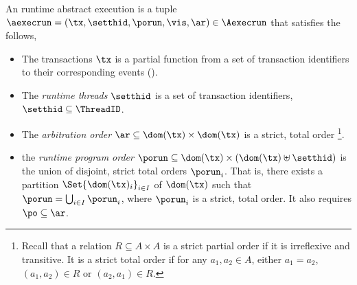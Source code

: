 \begin{defn}
\label{def:run-abs-exec}
\label{def:abs-exec}
An runtime abstract execution is a tuple \( \aexecrun = (\tx, \setthid, \porun, \vis, \ar) \in \Aexecrun \) that satisfies the follows,

\begin{itemize}
\item The transactions \( \tx \) is a partial function from a set of transaction identifiers to their corresponding events ().

\item The \emph{runtime threads} \( \setthid \) is a set of transaction identifiers, \ie \( \setthid \subseteq \ThreadID \).

\item 
The \emph{arbitration order} $\ar \subseteq \dom(\tx) \times \dom(\tx)$ is a strict, total order%
\footnote{Recall that a relation $R \subseteq A \times A$ is a strict partial order if it is irreflexive and transitive.
It is a strict total order if for any $a_1, a_2 \in A$, either $a_1 = a_2$, $(a_1, a_2) \in R$ or $(a_2, a_1) \in R$.}.
\item
the \emph{runtime program order} $\porun \subseteq \dom(\tx) \times ( \dom(\tx) \uplus \setthid )$ is the union of disjoint, strict total orders \( \porun_{i} \).
That is, there exists a partition $\Set{ \dom(\tx)_{i} }_{i \in I}$ of $\dom(\tx)$ such that $\porun = \bigcup_{i \in I} \porun_{i}$, where $\porun_{i}$ is a strict, total order.
It also requires \( \po \subseteq \ar\).


\end{itemize}
\end{defn}
